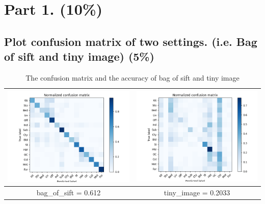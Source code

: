 \documentclass[a4paper, 12pt]{article}
\begin{document}
\section{Part 1. (10\%)}
\subsection{Plot confusion matrix of two settings. (i.e. Bag of sift and tiny image) (5\%)}
\begin{table}[!htb]
    \centering
    \caption{The confusion matrix and the accuracy of bag of sift and tiny image}
    \begin{tabular}{|c|c|}
        \hline
        \includegraphics[scale=0.5]{p1/bag_of_sift.png} & \includegraphics[scale=0.5]{p1/tiny_image.png} \\
        \hline
        bag\_of\_sift = 0.612                           & tiny\_image = 0.2033                           \\
        \hline
    \end{tabular}
\end{table}
\end{document}
